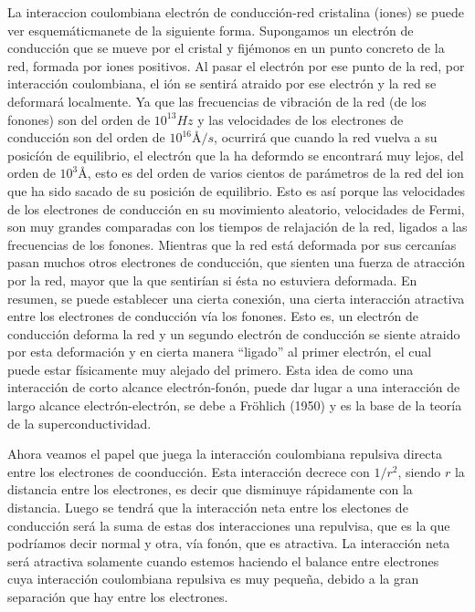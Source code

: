 La interaccion coulombiana electrón de conducción-red cristalina (iones) se puede ver esquemáticmanete de la siguiente forma. Supongamos un electrón de conducción que se mueve por el cristal y fijémonos en un punto concreto de la red, formada por iones positivos. Al pasar el electrón por ese punto de la red, por interacción coulombiana, el ión se sentirá atraido por ese electrón y la red se deformará localmente. Ya que las frecuencias de vibración de la red (de los fonones) son del orden de $10^{13} Hz$ y las velocidades de los electrones de conducción son del orden de $10^{16} Å/s$, ocurrirá que cuando la red vuelva a su posicíón de equilibrio, el electrón que la ha deformdo se encontrará muy lejos, del orden de $10^3 Å$, esto es del orden de varios cientos de parámetros de la red del ion que ha sido sacado de su posición de equilibrio. Esto es así porque las velocidades de los electrones de conducción en su movimiento aleatorio, velocidades de Fermi, son muy grandes comparadas con los tiempos de relajación de la red, ligados a las frecuencias de los fonones. Mientras que la red está deformada por sus cercanías pasan muchos otros electrones de conducción, que sienten una fuerza de atracción por la red, mayor que la que sentirían si ésta no estuviera deformada. En resumen, se puede establecer una cierta conexión, una cierta interacción atractiva entre los electrones de conducción vía los fonones. Esto es, un electrón de conducción deforma la red y un segundo electrón de conducción se siente atraido por esta deformación y en cierta manera ``ligado'' al primer electrón, el cual puede estar físicamente muy alejado del primero. Esta idea de como una interacción de corto alcance electrón-fonón, puede dar lugar a una interacción de largo alcance electrón-electrón, se debe a Fröhlich (1950) \cite{frohlich} y es la base de la teoría de la superconductividad.

Ahora veamos el papel que juega la interacción coulombiana repulsiva directa entre los electrones de coonducción. Esta interacción decrece con $1/r^2$, siendo $r$ la distancia entre los electrones, es decir que disminuye rápidamente con la distancia. Luego se tendrá que la interacción neta entre los electones de conducción será la suma de estas dos interacciones una repulvisa, que es la que podríamos decir normal y otra, vía fonón, que es atractiva. La interacción neta será atractiva solamente cuando estemos haciendo el balance entre electrones cuya interacción coulombiana repulsiva es muy pequeña, debido a la gran separación que hay entre los electrones.

